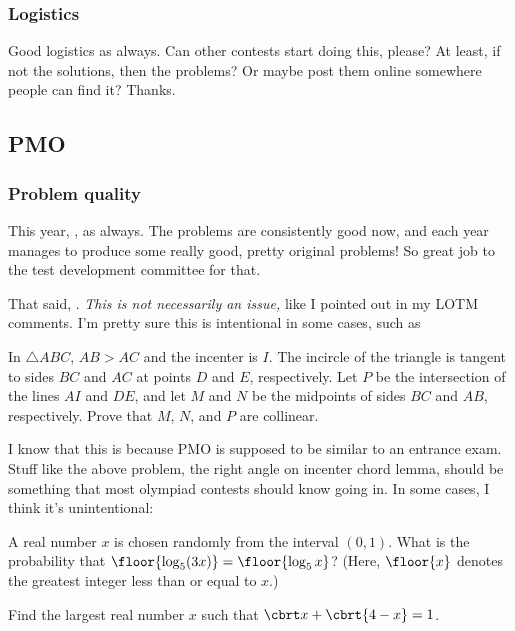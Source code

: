 \documentclass[11pt,paper=letter]{scrartcl}
\begin{document}
\subsubsection*{Logistics}

Good logistics as always.  Can other contests start doing this, please? At least, if not the solutions, then the problems? Or maybe post them online somewhere people can find it? Thanks.

\subsection{PMO}

\subsubsection*{Problem quality}

This year, , as always. The problems are consistently good now, and each year manages to produce some really good, pretty original problems! So great job to the test development committee for that.

That said, . \emph{This is not necessarily an issue,} like I pointed out in my LOTM comments. I'm pretty sure this is intentional in some cases, such as

\begin{probboxed}
  [Areas II2] In $\triangle ABC$, $AB > AC$ and the incenter is $I$. The incircle of the triangle is tangent to sides $BC$ and $AC$ at points $D$ and $E$, respectively. Let $P$ be the intersection of the lines $AI$ and $DE$, and let $M$ and $N$ be the midpoints of sides $BC$ and $AB$, respectively. Prove that $M$, $N$, and $P$ are collinear.
\end{probboxed}

I know that this is because PMO is supposed to be similar to an entrance exam. Stuff like the above problem, the right angle on incenter chord lemma, should be something that most olympiad contests should know going in. In some cases, I think it's unintentional:

\begin{probboxed}
  [Qualifying II9] A real number $x$ is chosen randomly from the interval $(0, 1)$. What is the probability that $\floor{\log_5(3x)} = \floor{\log_5 x}$? (Here, $\floor{x}$ denotes the greatest integer less than or equal to $x$.)
\end{probboxed}
\vspace{-10pt}
\begin{probboxed}
   Find the largest real number $x$ such that $\cbrt x + \cbrt{4-x} = 1$.
\end{probboxed}
\end{document}

